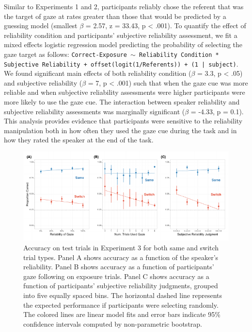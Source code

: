 \documentclass[authoryear, review]{elsarticle}
\newenvironment{CodeChunk}{}{}
\begin{document}
Similar to Experiments 1 and 2, participants reliably chose the referent
that was the target of gaze at rates greater than those that would be
predicted by a guessing model (smallest \(\beta\) = 2.57, z = 33.43, p
\textless{} .001). To quantify the effect of reliability condition and
participants' subjective reliability assessment, we fit a mixed effects
logistic regression model predicting the probability of selecting the
gaze target as follows:
\texttt{Correct-Exposure $\sim$ Reliability Condition * Subjective Reliability + offset(logit(1/Referents)) + (1 | subject)}.
We found significant main effects of both reliability condition
(\(\beta\) = 3.3, p \textless{} .05) and subjective reliability
(\(\beta\) = 7, p \textless{} .001) such that when the gaze cue was more
reliable and when subjective reliability assessments were higher
participants were more likely to use the gaze cue. The interaction
between speaker reliability and subjective reliability assessments was
marginally significant (\(\beta\) = -4.33, p = 0.1). This analysis
provides evidence that participants were sensitive to the reliability
manipulation both in how often they used the gaze cue during the task
and in how they rated the speaker at the end of the task.

\begin{CodeChunk}
\begin{figure}[tb]
\includegraphics{figs/expt3-plot-1} \caption[Accuracy on test trials in Experiment 3 for both same and switch trial types]{Accuracy on test trials in Experiment 3 for both same and switch trial types. Panel A shows accuracy as a function of the speaker's reliability. Panel B shows accuracy as a function of participants' gaze following on exposure trials. Panel C shows accuracy as a function of participants' subjective reliability judgments, grouped into five equally spaced bins. The horizontal dashed line represents the expected performance if participants were selecting randomly. The colored lines are linear model fits and error bars indicate 95\% confidence intervals computed by non-parametric bootstrap.}\label{fig:expt3-plot}
\end{figure}
\end{CodeChunk}
\end{document}
